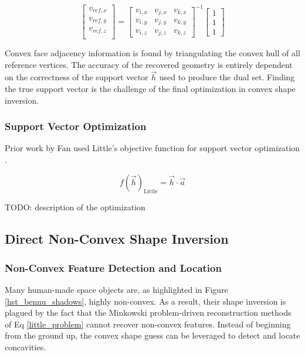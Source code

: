 \begin{equation}
  \begin{bmatrix}
    v_{ref,x} \\
    v_{ref,y} \\
    v_{ref,z} \\
  \end{bmatrix} = \begin{bmatrix}
    v_{i,x} & v_{j,x} & v_{k,x} \\
    v_{i,y} & v_{j,y} & v_{k,y} \\
    v_{i,z} & v_{j,z} & v_{k,z}
  \end{bmatrix}^{-1} \begin{bmatrix}
    1 \\ 1 \\ 1
  \end{bmatrix}
\end{equation}

Convex face adjacency information is found by triangulating the convex hull of all reference vertices. The accuracy of the recovered geometry is entirely dependent on the correctness of the support vector $\vec{h}$ used to produce the dual set. Finding the true support vector is the challenge of the final optimization in convex shape inversion.

\subsubsection{Support Vector Optimization}

Prior work by Fan used Little's objective function for support vector optimization \cite{fan2020thesis,little1983}.

\begin{equation} \label{little_obj}
  f(\vec{h})_{\textrm{Little}} = \vec{h} \cdot \vec{a}
\end{equation} 

TODO: description of the optimization

\subsection{Direct Non-Convex Shape Inversion}

\subsubsection{Non-Convex Feature Detection and Location}

Many human-made space objects are, as highlighted in Figure \ref{hst_bennu_shadows}, highly non-convex. As a result, their shape inversion is plagued by the fact that the Minkowski problem-driven reconstruction methods of Eq \ref{little_problem} cannot recover non-convex features. Instead of beginning from the ground up, the convex shape guess can be leveraged to detect and locate concavities.

